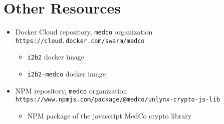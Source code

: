 \section{Other Resources}
\begin{itemize}
    \item Docker Cloud repository, \verb|medco| organization \\
    \verb|https://cloud.docker.com/swarm/medco|
    \begin{itemize}
        \item \verb|i2b2| docker image
        \item \verb|i2b2-medco| docker image
    \end{itemize}
    
    \item NPM repository, \verb|medco| organization \\
    \verb|https://www.npmjs.com/package/@medco/unlynx-crypto-js-lib|
    \begin{itemize}
        \item NPM package of the javascript MedCo crypto library
    \end{itemize}
    
\end{itemize}
